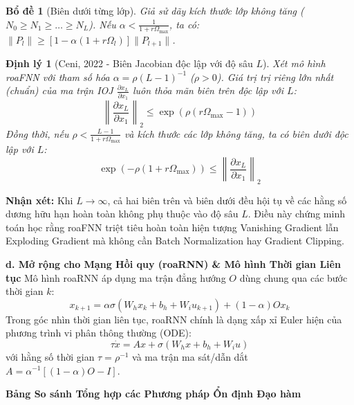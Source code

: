 \documentclass[12pt]{article}
\newtheorem{theorem}{Định lý}
\newtheorem{lemma}{Bổ đề}
\begin{document}
\begin{lemma}[Biên dưới từng lớp]
Giả sử dãy kích thước lớp không tăng ($N_0 \ge N_1 \ge \dots \ge N_L$). Nếu $\alpha < \frac{1}{1 + r \Omega_{\max}}$, ta có: $\|P_l\| \ge \left[ 1 - \alpha (1 + r \Omega_l) \right] \|P_{l+1}\|$.
\end{lemma}

\begin{theorem}[Ceni, 2022 - Biên Jacobian độc lập với độ sâu $L$]
Xét mô hình roaFNN với tham số hóa $\alpha = \rho (L-1)^{-1}$ ($\rho > 0$). Giá trị trị riêng lớn nhất (chuẩn) của ma trận IOJ $\frac{\partial x_L}{\partial x_1}$ luôn thỏa mãn biên trên độc lập với $L$:
\begin{equation}
\left\| \frac{\partial x_L}{\partial x_1} \right\|_2 \le \exp\left( \rho (r \Omega_{\max} - 1) \right)
\end{equation}
Đồng thời, nếu $\rho < \frac{L-1}{1 + r \Omega_{\max}}$ và kích thước các lớp không tăng, ta có biên dưới độc lập với $L$:
\begin{equation}
\exp\left( -\rho (1 + r \Omega_{\max}) \right) \le \left\| \frac{\partial x_L}{\partial x_1} \right\|_2
\end{equation}
\end{theorem}

\textbf{Nhận xét:} Khi $L \to \infty$, cả hai biên trên và biên dưới đều hội tụ về các hằng số dương hữu hạn hoàn toàn không phụ thuộc vào độ sâu $L$. Điều này chứng minh toán học rằng roaFNN triệt tiêu hoàn toàn hiện tượng Vanishing Gradient lẫn Exploding Gradient mà không cần Batch Normalization hay Gradient Clipping.

\textbf{d. Mở rộng cho Mạng Hồi quy (roaRNN) \& Mô hình Thời gian Liên tục}
Mô hình roaRNN áp dụng ma trận đẳng hướng $O$ dùng chung qua các bước thời gian $k$:
\begin{equation}
x_{k+1} = \alpha \sigma(W_h x_k + b_h + W_i u_{k+1}) + (1-\alpha) O x_k
\end{equation}
Trong góc nhìn thời gian liên tục, roaRNN chính là dạng xấp xỉ Euler hiện của phương trình vi phân thông thường (ODE):
\begin{equation}
\tau \dot{x} = A x + \sigma(W_h x + b_h + W_i u)
\end{equation}
với hằng số thời gian $\tau = \rho^{-1}$ và ma trận ma sát/dẫn dắt $A = \alpha^{-1} \left[ (1-\alpha)O - I \right]$.

\textbf{Bảng So sánh Tổng hợp các Phương pháp Ổn định Đạo hàm}
\end{document}

